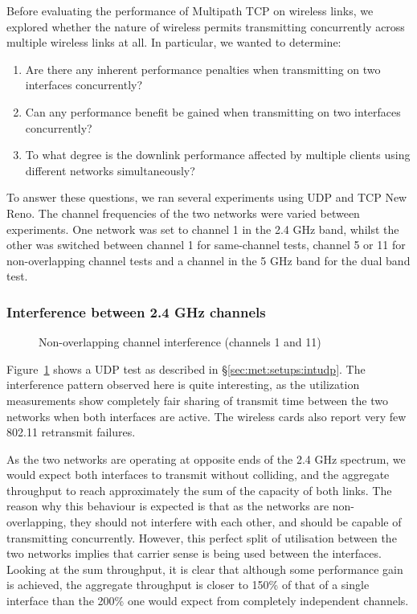Before evaluating the performance of Multipath TCP on wireless links, we
explored whether the nature of wireless permits transmitting concurrently across
multiple wireless links at all. In particular, we wanted to determine:

\begin{enumerate}
  \item Are there any inherent performance penalties when transmitting on two
    interfaces concurrently?
  \item Can any performance benefit be gained when transmitting on two
    interfaces concurrently?
  \item To what degree is the downlink performance affected by multiple clients
    using different networks simultaneously?
\end{enumerate}

To answer these questions, we ran several experiments using UDP and TCP New
Reno. The channel frequencies of the two networks were varied between
experiments. One network was set to channel 1 in the 2.4 GHz band, whilst the
other was switched between channel 1 for same-channel tests, channel 5 or 11 for
non-overlapping channel tests and a channel in the 5 GHz band for the dual band
test.

\subsubsection{Interference between 2.4 GHz channels}

\begin{figure}[h]
 \centering
 
 \caption{Non-overlapping channel interference (channels 1 and 11)}\label{graph:cc-interference}
\end{figure}

Figure~\ref{graph:cc-interference} shows a UDP test as described in
\S\ref{sec:met:setups:intudp}. The interference pattern observed here is quite
interesting, as the utilization measurements show completely fair sharing of
transmit time between the two networks when both interfaces are active. The
wireless cards also report very few 802.11 retransmit failures.

As the two networks are operating at opposite ends of the 2.4 GHz spectrum, we
would expect both interfaces to transmit without colliding, and the aggregate
throughput to reach approximately the sum of the capacity of both links. The
reason why this behaviour is expected is that as the networks are
non-overlapping, they should not interfere with each other, and should be
capable of transmitting concurrently. However, this perfect split of utilisation
between the two networks implies that carrier sense is being used between the
interfaces. Looking at the sum throughput, it is clear that although some
performance gain is achieved, the aggregate throughput is closer to 150\% of
that of a single interface than the 200\% one would expect from completely
independent channels.

